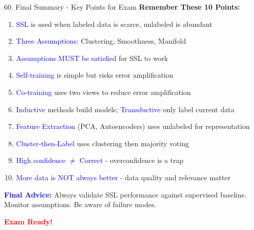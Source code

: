 \documentclass[8pt]{beamer}
\begin{document}
	\begin{frame}{60. Final Summary - Key Points for Exam}
		\fontsize{6.5}{7.5}\selectfont
		\textbf{Remember These 10 Points:}
		
		\begin{enumerate}
			\item \textcolor{blue}{SSL} is used when labeled data is scarce, unlabeled is abundant
			\item \textcolor{blue}{Three Assumptions:} Clustering, Smoothness, Manifold
			\item \textcolor{blue}{Assumptions MUST be satisfied} for SSL to work
			\item \textcolor{blue}{Self-training} is simple but risks error amplification
			\item \textcolor{blue}{Co-training} uses two views to reduce error amplification
			\item \textcolor{blue}{Inductive} methods build models; \textcolor{blue}{Transductive} only label current data
			\item \textcolor{blue}{Feature Extraction} (PCA, Autoencoders) uses unlabeled for representation
			\item \textcolor{blue}{Cluster-then-Label} uses clustering then majority voting
			\item \textcolor{blue}{High confidence $\neq$ Correct} - overconfidence is a trap
			\item \textcolor{blue}{More data is NOT always better} - data quality and relevance matter
		\end{enumerate}
		
		\vspace{0.2cm}
		\textcolor{blue}{\textbf{Final Advice:}} Always validate SSL performance against supervised baseline. Monitor assumptions. Be aware of failure modes.
		
		\vspace{0.2cm}
		\textcolor{red}{\textbf{Exam Ready!}}
	\end{frame}
	
\end{document}
